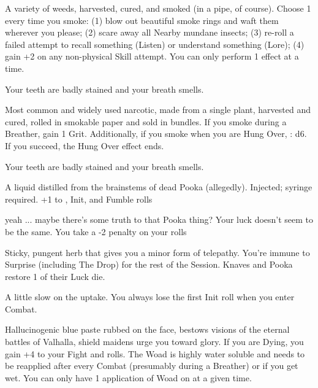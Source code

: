 {\begin{multicols}{2}

  A variety of weeds, harvested, cured, and smoked (in a pipe, of course). Choose 1 every time you smoke: (1) blow out beautiful smoke rings and waft them wherever you please; (2) scare away all Nearby mundane insects; (3) re-roll a failed attempt to recall something (Listen) or understand something (Lore); (4) gain +2 on any non-physical Skill \RO attempt.  You can only perform 1 effect at a time.  

     Your teeth are badly stained and your breath smells.



  Most common and widely used narcotic, made from a single plant, harvested and cured, rolled in smokable paper and sold in bundles.  If you smoke during a Breather, gain 1 Grit.  Additionally, if you smoke when you are Hung Over, \RS : d6.  If you succeed, the Hung Over effect ends.

    Your teeth are badly stained and your breath smells.  


  A liquid distilled from the brainstems of dead Pooka (allegedly).  Injected; syringe required.  +1 to \DEX, Init, and Fumble rolls

    yeah ... maybe there's some truth to that Pooka thing?  Your luck doesn't seem to be the same.  You take a -2 penalty on your \DEATH rolls


  Sticky, pungent herb that gives you a minor form of telepathy.  You're immune to Surprise (including The Drop) for the rest of the Session.  Knaves and Pooka restore 1 \UD of their Luck die.

    A little slow on the uptake.  You always lose the first Init roll when you enter Combat.



  Hallucinogenic blue paste rubbed on the face, bestows visions of the eternal battles of Valhalla, shield maidens urge you toward glory.  If you are Dying, you gain +4 to your Fight \RO and \DEATH rolls. The Woad is highly water soluble and needs to be reapplied after every Combat (presumably during a Breather) or if you get wet.  You can only have 1 application of Woad on at a given time.


\end{multicols}}
